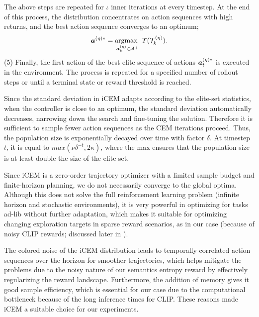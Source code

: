 The above steps are repeated for \(\iota\) inner iterations at every timestep.
At the end of this process, the distribution concentrates on action sequences with high returns, and the best action sequence converges to an optimum;
\begin{equation}
    \label{eq:planning-goal}
    \bm{a}^{(\eta)*} = \operatorname*{argmax~}_{\bm{a}^{(\eta)}_k \in \mathcal{A}^+} \mathit{\Upsilon}(\mathcal{T}^{(\eta)}_k).
\end{equation}
(5) Finally, the first action of the best elite sequence of actions \(\bm{a}^{(\eta)*}_t\) is executed in the environment.
The process is repeated for a specified number of rollout steps or until a terminal state or reward threshold is reached.

Since the standard deviation in iCEM adapts according to the elite-set statistics, when the controller is close to an optimum, the standard deviation automatically decreases, narrowing down the search and fine-tuning the solution.
Therefore it is sufficient to sample fewer action sequences as the CEM iterations proceed.
Thus, the population size is exponentially decayed over time with factor \(\delta\). 
At timestep \(t\), it is equal to \(max(\nu \delta^{-t}, 2\kappa)\), where the max ensures that the population size is at least double the size of the elite-set.

Since iCEM is a zero-order trajectory optimizer with a limited sample budget and finite-horizon planning, we do not necessarily converge to the global optima.
Although this does not solve the full reinforcement learning problem (infinite horizon and stochastic environments), it is very powerful in optimizing for tasks ad-lib without further adaptation, which makes it suitable for optimizing changing exploration targets in sparse reward scenarios, as in our case (because of noisy CLIP rewards; discussed later in ).

The colored noise of the iCEM distribution leads to temporally correlated action sequences over the horizon for smoother trajectories, which helps mitigate the problems due to the noisy nature of our semantics entropy reward by effectively regularizing the reward landscape.
Furthermore, the addition of memory gives it good sample efficiency, which is essential for our case due to the computational bottleneck because of the long inference times for CLIP.
These reasons made iCEM a suitable choice for our experiments.

